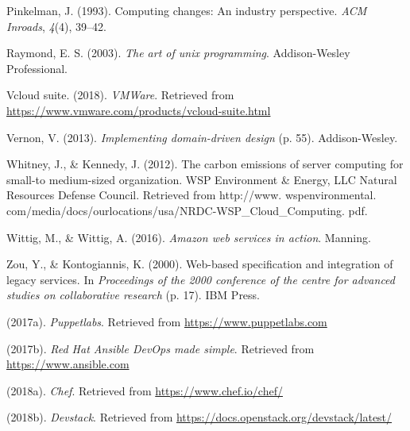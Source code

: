 \documentclass[12pt,twoside]{reedthesis}
\theoremstyle{definition}
\theoremstyle{definition}
\theoremstyle{definition}
\theoremstyle{remark}
\begin{document}
\leavevmode\hypertarget{ref-Cap1_ACMInroads}{}%
Pinkelman, J. (1993). Computing changes: An industry perspective.
\emph{ACM Inroads}, \emph{4}(4), 39--42.

\leavevmode\hypertarget{ref-Cap3_ArtOfLinux}{}%
Raymond, E. S. (2003). \emph{The art of unix programming}.
Addison-Wesley Professional.

\leavevmode\hypertarget{ref-Cap3_6_mT}{}%
Vcloud suite. (2018). \emph{VMWare}. Retrieved from
\url{https://www.vmware.com/products/vcloud-suite.html}

\leavevmode\hypertarget{ref-Cap4_ImplementingPlantillaDibujo}{}%
Vernon, V. (2013). \emph{Implementing domain-driven design} (p. 55).
Addison-Wesley.

\leavevmode\hypertarget{ref-Cap1_1_PdP}{}%
Whitney, J., \& Kennedy, J. (2012). The carbon emissions of server
computing for small-to medium-sized organization. WSP Environment \&
Energy, LLC Natural Resources Defense Council. Retrieved from
http://www. wspenvironmental.
com/media/docs/ourlocations/usa/NRDC-WSP\_Cloud\_Computing. pdf.

\leavevmode\hypertarget{ref-Cap3_7mT}{}%
Wittig, M., \& Wittig, A. (2016). \emph{Amazon web services in action}.
Manning.

\leavevmode\hypertarget{ref-Cap1_WebBased}{}%
Zou, Y., \& Kontogiannis, K. (2000). Web-based specification and
integration of legacy services. In \emph{Proceedings of the 2000
conference of the centre for advanced studies on collaborative research}
(p. 17). IBM Press.

\leavevmode\hypertarget{ref-Cap3_Puppet}{}%
(2017a). \emph{Puppetlabs}. Retrieved from
\url{https://www.puppetlabs.com}

\leavevmode\hypertarget{ref-Cap3_ansible}{}%
(2017b). \emph{Red Hat Ansible DevOps made simple}. Retrieved from
\url{https://www.ansible.com}

\leavevmode\hypertarget{ref-Cap3_9mT}{}%
(2018a). \emph{Chef}. Retrieved from \url{https://www.chef.io/chef/}

\leavevmode\hypertarget{ref-Cap4_devstack}{}%
(2018b). \emph{Devstack}. Retrieved from
\url{https://docs.openstack.org/devstack/latest/}


\end{document}
